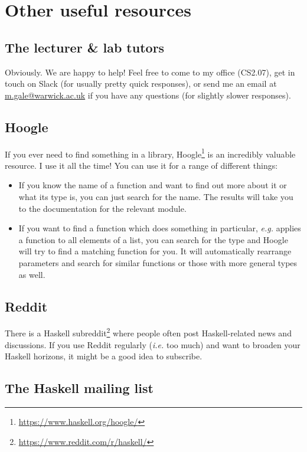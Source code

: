 \section{Other useful resources}

\subsection{The lecturer \& lab tutors} 

Obviously. We are happy to help! Feel free to come to my office (CS2.07), get in touch on Slack (for usually pretty quick responses), or send me an email at \href{mailto:m.gale@warwick.ac.uk}{m.gale@warwick.ac.uk} if you have any questions (for slightly slower responses). 

\subsection{Hoogle} 

If you ever need to find something in a library, Hoogle\footnote{\url{https://www.haskell.org/hoogle/}} is an incredibly valuable resource. I use it all the time! You can use it for a range of different things:
\begin{itemize}
\item If you know the name of a function and want to find out more about it or what its type is, you can just search for the name. The results will take you to the documentation for the relevant module.
\item If you want to find a function which does something in particular, \emph{e.g.} applies a function to all elements of a list, you can search for the type and Hoogle will try to find a matching function for you. It will automatically rearrange parameters and search for similar functions or those with more general types as well. 
\end{itemize}

\subsection{Reddit} 

There is a Haskell subreddit\footnote{\url{https://www.reddit.com/r/haskell/}} where people often post Haskell-related news and discussions. If you use Reddit regularly (\emph{i.e.} too much) and want to broaden your Haskell horizons, it might be a good idea to subscribe.

\subsection{The Haskell mailing list} 

